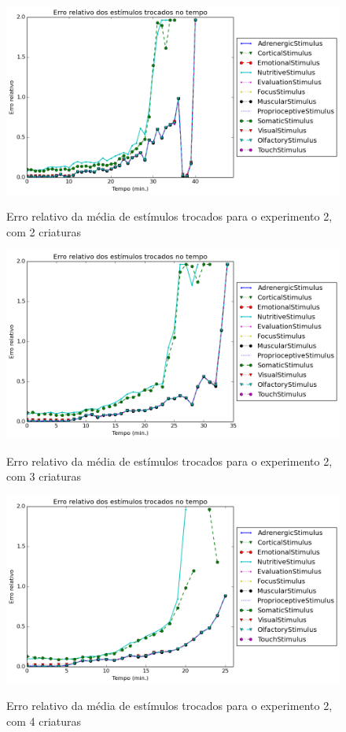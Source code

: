 \begin{apendicesenv}
\begin{figure}[H]
 \centering
 \caption{Erro relativo da média de estímulos trocados para o experimento 2, com 2 criaturas}
 \includegraphics[scale=0.6]{04-figuras/experiments/exp_2/2/avgExchangedStimuliOverTime_err.png}
 \label{fig:exp_2_2_avgExchStimuli_err}
\end{figure}

\begin{figure}[H]
 \centering
 \caption{Erro relativo da média de estímulos trocados para o experimento 2, com 3 criaturas}
 \includegraphics[scale=0.6]{04-figuras/experiments/exp_2/3/avgExchangedStimuliOverTime_err.png}
 \label{fig:exp_2_3_avgExchStimuli_err}
\end{figure}

\begin{figure}[H]
 \centering
 \caption{Erro relativo da média de estímulos trocados para o experimento 2, com 4 criaturas}
 \includegraphics[scale=0.6]{04-figuras/experiments/exp_2/4/avgExchangedStimuliOverTime_err.png}
 \label{fig:exp_2_4_avgExchStimuli_err}
\end{figure}


\end{apendicesenv}
